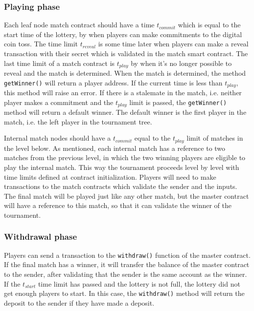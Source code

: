 \subsubsection{Playing phase}
Each leaf node match contract should have a time $t_{commit}$ which is equal to the start time of the lottery, by when players can make commitments to the digital coin toss. The time limit $t_{reveal}$ is some time later when players can make a reveal transaction with their secret which is validated in the match smart contract. The last time limit of a match contract is $t_{play}$ by when it's no longer possible to reveal and the match is determined. When the match is determined, the method \texttt{getWinner()} will return a player address. If the current time is less than $t_{play}$, this method will raise an error. If there is a stalemate in the match, i.e. neither player makes a commitment and the $t_{play}$ limit is passed, the \texttt{getWinner()} method will return a default winner. The default winner is the first player in the match, i.e. the left player in the tournament tree. 

Internal match nodes should have a $t_{commit}$ equal to the $t_{play}$ limit of matches in the level below. As mentioned, each internal match has a reference to two matches from the previous level, in which the two winning players are eligible to play the internal match. This way the tournament proceeds level by level with time limits defined at contract initialization. Players will need to make transactions to the match contracts which validate the sender and the inputs. The final match will be played just like any other match, but the master contract will have a reference to this match, so that it can validate the winner of the tournament.

\subsubsection{Withdrawal phase}
Players can send a transaction to the \texttt{withdraw()} function of the master contract. If the final match has a winner, it will transfer the balance of the master contract to the sender, after validating that the sender is the same account as the winner. If the $t_{start}$ time limit has passed and the lottery is not full, the lottery did not get enough players to start. In this case, the \texttt{withdraw()} method will return the deposit to the sender if they have made a deposit.
